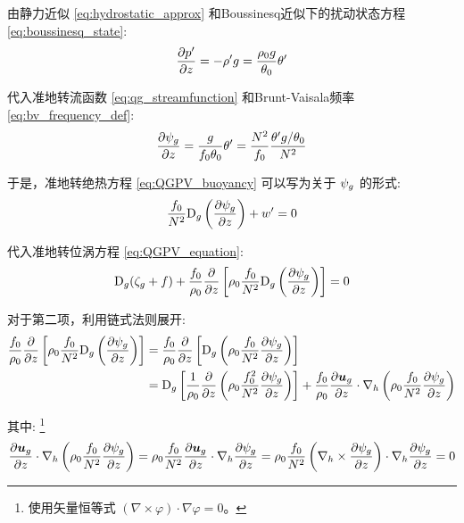 \begin{proofbox}
    由静力近似 \eqref{eq:hydrostatic_approx} 和Boussinesq近似下的扰动状态方程 \eqref{eq:boussinesq_state}:
    \begin{equation*}
        \pde{\pressure^\prime}{z} = -\density^\prime \gravityconst = \frac{\density_0 \gravityconst}{\ptemp_0} \ptemp^\prime
    \end{equation*}

    代入准地转流函数 \eqref{eq:qg_streamfunction} 和Brunt-Vaisala频率 \eqref{eq:bv_frequency_def}:
    \begin{equation*}
        \pde{\streamfunc_g}{z} = \frac{\gravityconst}{\coriolis_0 \ptemp_0} \ptemp^\prime = \frac{\bvfreq^2}{\coriolis_0} \frac{\ptemp^\prime \gravityconst / \ptemp_0}{\bvfreq^2}
    \end{equation*}

    于是，准地转绝热方程 \eqref{eq:QGPV_buoyancy} 可以写为关于 $\psi_g$ 的形式:
    \begin{equation*}
        \frac{\coriolis_0}{\bvfreq^2} \mathrm{D}_g \left(\pde{\streamfunc_g}{z}\right) + w^\prime = 0
    \end{equation*}

    代入准地转位涡方程 \eqref{eq:QGPV_equation}:
    \begin{equation*}
        \mathrm{D}_g (\relvort_g + \coriolis) + \frac{\coriolis_0}{\density_0} \pde{}{z}\left[\density_0 \frac{\coriolis_0}{\bvfreq^2} \mathrm{D}_g \left(\pde{\streamfunc_g}{z}\right)\right] = 0
    \end{equation*}

    对于第二项，利用链式法则展开:
    \begin{align*}
        \frac{\coriolis_0}{\density_0} \pde{}{z}\left[\density_0 \frac{\coriolis_0}{\bvfreq^2} \mathrm{D}_g \left(\pde{\streamfunc_g}{z}\right)\right] &= \frac{\coriolis_0}{\density_0} \pde{}{z}\left[\mathrm{D}_g \left(\density_0 \frac{\coriolis_0}{\bvfreq^2} \pde{\streamfunc_g}{z}\right)\right] \\
        &= \mathrm{D}_g \left[\frac{1}{\density_0} \pde{}{z}\left(\density_0 \frac{\coriolis_0^2}{\bvfreq^2} \pde{\streamfunc_g}{z}\right)\right] + \frac{\coriolis_0}{\density_0} \pde{\vel_g}{z} \cdot \nabla_h \left(\density_0 \frac{\coriolis_0}{\bvfreq^2} \pde{\streamfunc_g}{z}\right)
    \end{align*}

    其中:
    \footnote{使用矢量恒等式 $(\nabla \times \varphi) \cdot \nabla \varphi = 0$。}
    \begin{equation*}
        \pde{\vel_g}{z} \cdot \nabla_h \left(\density_0 \frac{\coriolis_0}{\bvfreq^2} \pde{\streamfunc_g}{z}\right) = \density_0 \frac{\coriolis_0}{\bvfreq^2} \pde{\vel_g}{z} \cdot \nabla_h \pde{\streamfunc_g}{z} = \density_0 \frac{\coriolis_0}{\bvfreq^2} \left(\nabla_h \times \pde{\streamfunc_g}{z}\right) \cdot \nabla_h \pde{\streamfunc_g}{z} = 0
    \end{equation*}


\end{proofbox}
